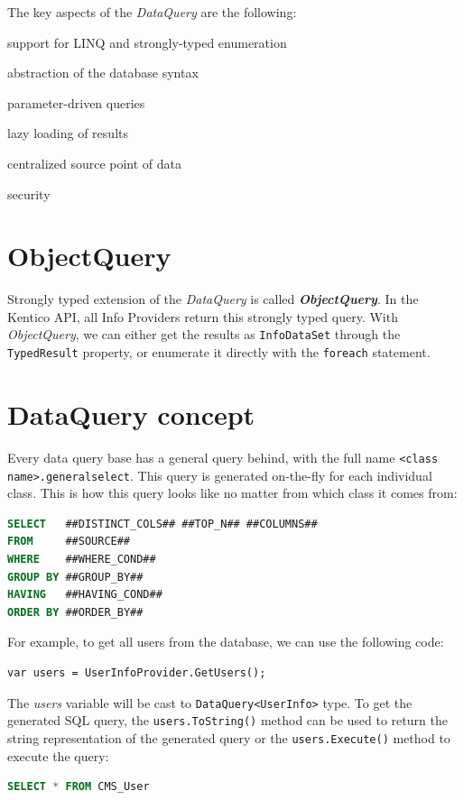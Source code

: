 \documentclass[
  print,
  table,
  nolof,
  nolot,
  nocover,
  oneside
]{fithesis3}
\begin{document}
The key aspects of the \textit{DataQuery} are the following:
\begin{compactitem}
  \item support for LINQ and strongly-typed enumeration
  \item abstraction of the database syntax
  \item parameter-driven queries
  \item lazy loading of results
  \item centralized source point of data
  \item security
\end{compactitem}


\section{ObjectQuery}
\label{ObjectQuery}

Strongly typed extension of the \textit{DataQuery} is called \textit{\textbf{ObjectQuery}}. In the Kentico API, all Info Providers return this strongly typed query. With \textit{ObjectQuery}, we can either get the results as \texttt{InfoDataSet} through the \texttt{TypedResult} property, or enumerate it directly with the \texttt{foreach} statement.


\section{DataQuery concept}
\label{DataQuery concept}

Every data query base has a general query behind, with the full name \texttt{<class name>.generalselect}. This query is generated on-the-fly for each individual class. This is how this query looks like no matter from which class it comes from:
\begin{lstlisting}[language=SQL,escapechar=@,language=SQL,basicstyle=\ttfamily]
SELECT   ##DISTINCT_COLS## ##TOP_N## ##COLUMNS##
FROM     ##SOURCE##
WHERE    ##WHERE_COND##
GROUP BY ##GROUP_BY##
HAVING   ##HAVING_COND##
ORDER BY ##ORDER_BY##
\end{lstlisting}

For example, to get all users from the database, we can use the following code:
\begin{lstlisting}
var users = UserInfoProvider.GetUsers();
\end{lstlisting}
The \textit{users} variable will be cast to \texttt{DataQuery<UserInfo>} type. To get the generated SQL query, the \texttt{users.ToString()} method can be used to return the string representation of the generated query or the \texttt{users.Execute()} method to execute the query:
\begin{lstlisting}[language=SQL,escapechar=@,language=SQL,basicstyle=\ttfamily]
SELECT * FROM CMS_User
\end{lstlisting}
\end{document}
